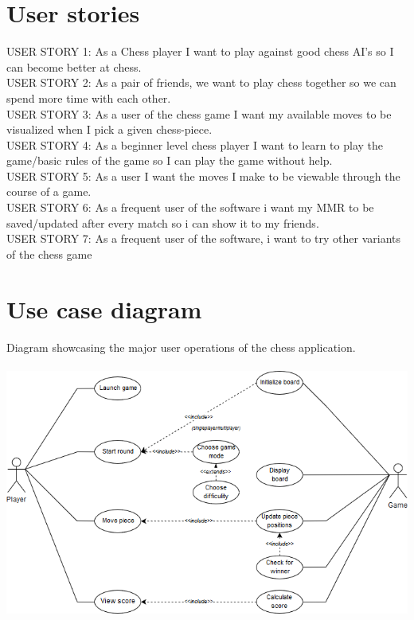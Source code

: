 \documentclass{article}
\begin{document}
    \section{User stories}
        USER STORY 1: As a Chess player I want to play against good chess AI’s
        so I can become better at chess. \\

        \noindent
        USER STORY 2: As a pair of friends, we want to play chess together so we
        can spend more time with each other. \\

        \noindent
        USER STORY 3: As a user of the chess game I want my available moves to
        be visualized when I pick a given chess-piece. \\

        \noindent
        USER STORY 4: As a beginner level chess player I want to learn to play
        the game/basic rules of the game so I can play the game without help. \\

        \noindent
        USER STORY 5: As a user I want the moves I make to be viewable through
        the course of a game. \\

        \noindent
        USER STORY 6: As a frequent user of the software i want my MMR to be
        saved/updated after every match so i can show it to my friends. \\

           \noindent
        USER STORY 7: As a frequent user of the software, i want to try other variants of the chess game \\


	\vspace{30mm}
    \section{Use case diagram}
    Diagram showcasing the major user operations of the chess application. \\ \\
    \includegraphics[scale=0.6]{usecase-diagram.png}
\end{document}
